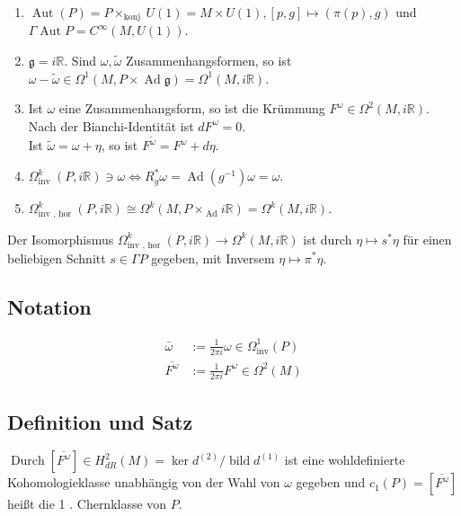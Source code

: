 \documentclass[10pt, letterpaper]{article}
\begin{document}
\begin{enumerate}
  \item $\operatorname{Aut}(P)=P \times_{\text {konj }} U(1)=M \times U(1),[p, g] \mapsto(\pi(p), g)$ und $\Gamma \operatorname{Aut} P= C^{\infty}(M, U(1))$.
  \item $\mathfrak{g}=i \mathbb{R}$. Sind $\omega, \tilde{\omega}$ Zusammenhangsformen, so ist $\omega-\tilde{\omega} \in \Omega^{1}(M, P \times \operatorname{Ad} \mathfrak{g})=\Omega^{1}(M, i \mathbb{R})$.
  \item Ist $\omega$ eine Zusammenhangsform, so ist die Krümmung $F^{\omega} \in \Omega^{2}(M, i \mathbb{R})$. Nach der Bianchi-Identität ist $d F^{\omega}=0$.\\
Ist $\tilde{\omega}=\omega+\eta$, so ist $F^{\tilde{\omega}}=F^{\omega}+d \eta$.
  \item $\Omega_{\text {inv }}^{k}(P, i \mathbb{R}) \ni \omega \Leftrightarrow R_{g}^{*} \omega=\operatorname{Ad}\left(g^{-1}\right) \omega=\omega$.
  \item $\Omega_{\text {inv }, \text { hor }}^{k}(P, i \mathbb{R}) \cong \Omega^{k}\left(M, P \times{ }_{\text {Ad }} i \mathbb{R}\right)=\Omega^{k}(M, i \mathbb{R})$.
\end{enumerate}

Der Isomorphismus $\Omega_{\text {inv }, \text { hor }}^{k}(P, i \mathbb{R}) \rightarrow \Omega^{k}(M, i \mathbb{R})$ ist durch $\eta \mapsto s^{*} \eta$ für einen beliebigen Schnitt $s \in \Gamma P$ gegeben, mit Inversem $\eta \mapsto \pi^{*} \eta$.

\subsection*{Notation}
$$
\begin{aligned}
\bar{\omega} & :=\frac{1}{2 \pi i} \omega \in \Omega_{\mathrm{inv}}^{1}(P) \\
\overline{F^{\omega}} & :=\frac{1}{2 \pi i} F^{\omega} \in \Omega^{2}(M)
\end{aligned}
$$

\subsection*{Definition und Satz}
$\operatorname{Durch}\left[\overline{F^{\omega}}\right] \in H_{d R}^{2}(M)=\operatorname{ker} d^{(2)} / \operatorname{bild} d^{(1)}$ ist eine wohldefinierte Kohomologieklasse unabhängig von der Wahl von $\omega$ gegeben und $c_{1}(P)=\left[\overline{F^{\omega}}\right]$ heißt die 1 . Chernklasse von $P$.
\end{document}
